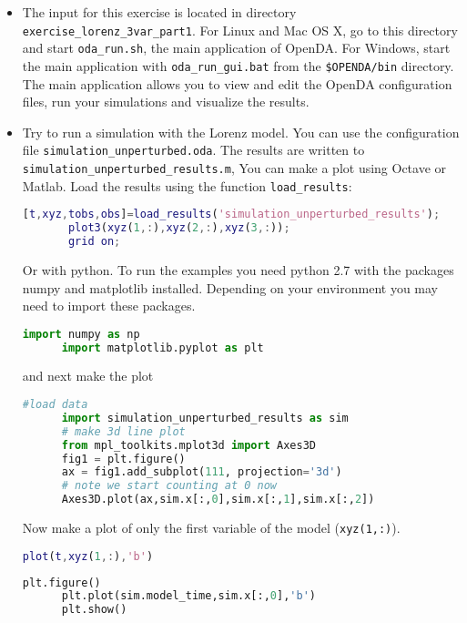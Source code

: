 \begin{itemize}
\item The input for this exercise is located in directory {\tt exercise\_lorenz\_3var\_part1}.
      For Linux and Mac OS X, go to this directory and start {\tt oda\_run.sh}, the
      main application of OpenDA. For Windows, start the main application with 
      {\tt oda\_run\_gui.bat} from the {\tt \$OPENDA/bin} directory. The main 
      application allows you to view and edit the OpenDA configuration files, run your
      simulations and visualize the results.
\item Try to run a simulation with the Lorenz model. You can use the
      configuration file {\tt simulation\_unperturbed.oda}. The results are
      written to {\tt simulation\_unperturbed\_results.m}, You can make a
      plot using Octave or Matlab. Load the results using the function
      {\tt load\_results}:
      \begin{lstlisting}[language=Matlab,frame=single,caption={Matlab}]
       [t,xyz,tobs,obs]=load_results('simulation_unperturbed_results');
       plot3(xyz(1,:),xyz(2,:),xyz(3,:));
       grid on;
      \end{lstlisting}
      Or with python. To run the examples you need python 2.7 with the packages numpy and matplotlib installed. Depending
      on your environment you may need to import these packages.
      \begin{lstlisting}[language=Python,frame=single,caption={Python initialize}]
      import numpy as np
      import matplotlib.pyplot as plt
      \end{lstlisting}
      and next make the plot
      \begin{lstlisting}[language=Python,frame=single,caption={Python}]
      #load data
      import simulation_unperturbed_results as sim
      # make 3d line plot
      from mpl_toolkits.mplot3d import Axes3D
      fig1 = plt.figure()
      ax = fig1.add_subplot(111, projection='3d')
      # note we start counting at 0 now
      Axes3D.plot(ax,sim.x[:,0],sim.x[:,1],sim.x[:,2])
      \end{lstlisting}
      
      Now make a plot of only the first variable of the model ({\tt xyz(1,:)}).
      \begin{lstlisting}[language=Matlab,frame=single,caption={Matlab}]
      plot(t,xyz(1,:),'b')
      \end{lstlisting}
      \begin{lstlisting}[language=Python,frame=single,caption={Python}]
      plt.figure()
      plt.plot(sim.model_time,sim.x[:,0],'b')
      plt.show()
      \end{lstlisting}
%


\end{itemize}
